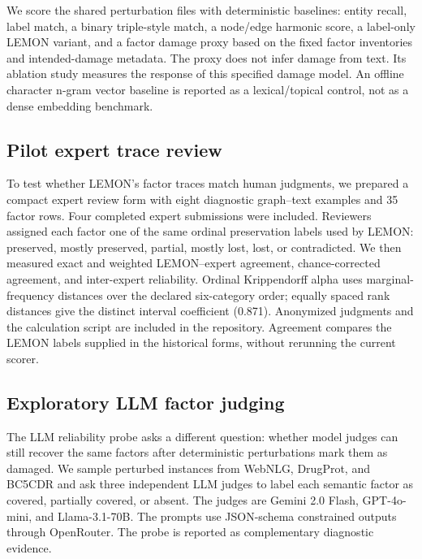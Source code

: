 We score the shared perturbation files with deterministic baselines: entity recall, label match, a binary triple-style match, a \minebase{} node/edge harmonic score, a label-only LEMON variant, and a factor damage proxy based on the fixed factor inventories and intended-damage metadata. The proxy does not infer damage from text. Its ablation study measures the response of this specified damage model. An offline character n-gram vector baseline is reported as a lexical/topical control, not as a dense embedding benchmark.

\subsection{Pilot expert trace review}
To test whether LEMON's factor traces match human judgments, we prepared a compact expert review form with eight diagnostic graph--text examples and 35 factor rows. Four completed expert submissions were included. Reviewers assigned each factor one of the same ordinal preservation labels used by LEMON: preserved, mostly preserved, partial, mostly lost, lost, or contradicted. We then measured exact and weighted LEMON--expert agreement, chance-corrected agreement, and inter-expert reliability. Ordinal Krippendorff alpha uses marginal-frequency distances over the declared six-category order; equally spaced rank distances give the distinct interval coefficient (0.871). Anonymized judgments and the calculation script are included in the repository. Agreement compares the LEMON labels supplied in the historical forms, without rerunning the current scorer.

\subsection{Exploratory LLM factor judging}
The LLM reliability probe asks a different question: whether model judges can still recover the same factors after deterministic perturbations mark them as damaged. We sample perturbed instances from WebNLG, DrugProt, and BC5CDR and ask three independent LLM judges to label each semantic factor as covered, partially covered, or absent. The judges are Gemini 2.0 Flash, GPT-4o-mini, and Llama-3.1-70B. The prompts use JSON-schema constrained outputs through OpenRouter. The probe is reported as complementary diagnostic evidence.
